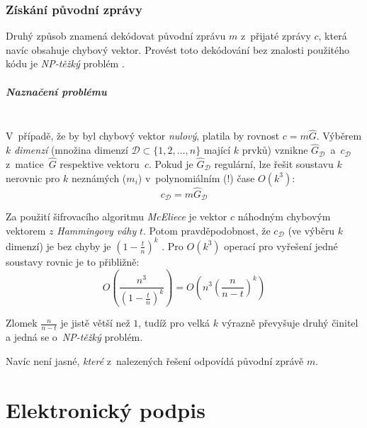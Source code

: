 \documentclass[thesis=M,czech,hidelinks]{FITthesis}[2012/06/26]
\newcommand{\0}{{\textcolor[gray]{0.75}{0}}}
\begin{document}
\subsection{Získání původní zprávy}

Druhý způsob znamená dekódovat původní zprávu $m$ z~přijaté zprávy $c$, která
navíc obsahuje chybový vektor. Provést toto dekódování bez znalosti použitého
kódu je \emph{NP-těžký} problém \cite{Berlekamp1}.


\paragraph{Naznačení problému} \hfil \\
V~případě, že by byl chybový vektor \emph{nulový}, platila by rovnost
$c = m\hat{G}$. Výběrem $k$ \emph{dimenzí} (množina dimenzí
$\mathcal{D} \subset \{1,2,\ldots,n\}$ mající $k$ prvků) vznikne
$\hat{G}_{\mathcal{D}}$~a~$c_{\mathcal{D}}$ z~matice~$\hat{G}$ respektive
vektoru~$c$. Pokud je $\hat{G}_{\mathcal{D}}$ regulární, lze řešit soustavu
$k$ nerovnic pro $k$ neznámých ($m_i$) v~polynomiálním (!) čase
$O\left(k^3\right)$:
$$ c_{\mathcal{D}} = m \hat{G}_{\mathcal{D}} $$


Za použití šifrovacího algoritmu \emph{McEliece} je vektor $c$ 
náhodným chybovým vektorem $z$ \emph{Hammingovy váhy} $t$. Potom
pravděpodobnost, že $c_{\mathcal{D}}$ (ve výběru $k$ dimenzí) je bez chyby je
$\left(1-\frac{t}{n}\right)^k$ \cite{McEliece}. Pro $O\left(k^3\right)$ operací
pro vyřešení jedné soustavy rovnic je to přibližně:
$$
    O\left( \frac{n^3}{\left(1-\frac{t}{n}\right)^k} \right) =
    O\left( n^3 \left(\frac{n}{n-t}\right)^k \right)
$$

Zlomek $\frac{n}{n-t}$ je jistě větší než $1$, tudíž pro velká $k$ výrazně
převyšuje druhý činitel a jedná se o~\emph{NP-těžký} problém.

Navíc není jasné, \emph{které} z~nalezených řešení odpovídá původní zprávě $m$.





\chapter{Elektronický podpis}\label{kap_podpis}
\end{document}
